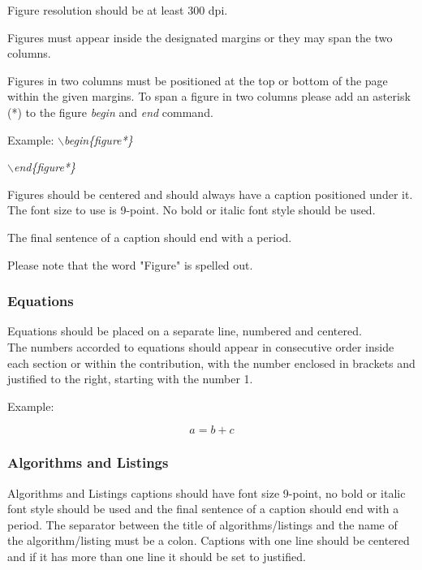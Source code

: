 \documentclass[a4paper,twoside]{article}
\begin{document}
Figure resolution should be at least 300 dpi.

Figures must appear inside the designated margins or they may span
the two columns.

Figures in two columns must be positioned at the top or bottom of
the page within the given margins. To span a figure in two columns please add an asterisk (*) to the figure \textit{begin} and \textit{end} command.

Example: \textit{$\backslash$begin\{figure*\}}

\hspace*{1.5cm}\textit{$\backslash$end\{figure*\}}

Figures should be centered and should always have a caption
positioned under it. The font size to use is 9-point. No bold or
italic font style should be used.


The final sentence of a caption should end with a period.



Please note that the word "Figure" is spelled out.

\subsubsection{Equations}

Equations should be placed on a separate line, numbered and
centered.\\The numbers accorded to equations should appear in
consecutive order inside each section or within the contribution,
with the number enclosed in brackets and justified to the right,
starting with the number 1.

Example:

\begin{equation}\label{eq1}
    a=b+c
\end{equation}

\subsubsection{Algorithms and Listings}

Algorithms and Listings captions should have font size 9-point, no bold or
italic font style should be used and the final sentence of a caption should end with a period. The separator between the title of algorithms/listings and the name of the algorithm/listing must be a colon.
Captions with one line should be centered and if it has more than one line it should be set to justified.
\end{document}
